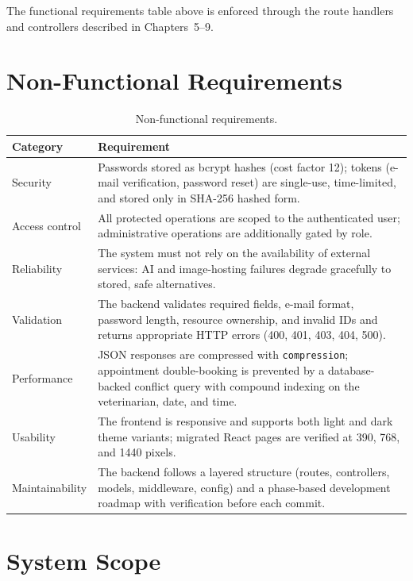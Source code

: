 The functional requirements table above is enforced through the route handlers
and controllers described in Chapters~5--9.

\section{Non-Functional Requirements}

\begingroup
\renewcommand{\arraystretch}{1.25}
\begin{table}[htbp]
\centering
\begin{tabular}{@{}p{3.0cm}p{11.5cm}@{}}
\toprule
\textbf{Category} & \textbf{Requirement} \\
\midrule
Security & Passwords stored as bcrypt hashes (cost factor 12); tokens (e-mail
verification, password reset) are single-use, time-limited, and stored only in
SHA-256 hashed form. \\
Access control & All protected operations are scoped to the authenticated user;
administrative operations are additionally gated by role. \\
Reliability & The system must not rely on the availability of external services:
AI and image-hosting failures degrade gracefully to stored, safe alternatives. \\
Validation & The backend validates required fields, e-mail format, password
length, resource ownership, and invalid IDs and returns appropriate HTTP errors
(400, 401, 403, 404, 500). \\
Performance & JSON responses are compressed with \texttt{compression};
appointment double-booking is prevented by a database-backed conflict query with
compound indexing on the veterinarian, date, and time. \\
Usability & The frontend is responsive and supports both light and dark theme
variants; migrated React pages are verified at 390, 768, and 1440 pixels. \\
Maintainability & The backend follows a layered structure
(routes, controllers, models, middleware, config) and a phase-based development
roadmap with verification before each commit. \\
\bottomrule
\end{tabular}
\caption{Non-functional requirements.}
\label{tab:nfr}
\end{table}
\endgroup

\section{System Scope}

